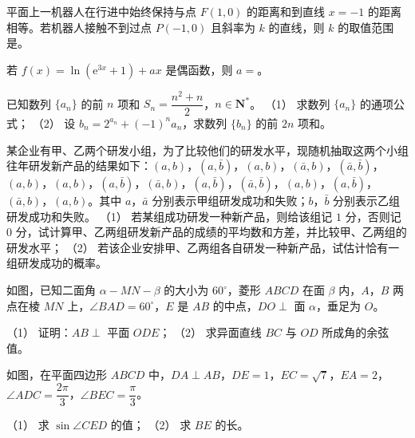 \begin{question}
平面上一机器人在行进中始终保持与点 $F(1,0)$ 的距离和到直线 $x=-1$ 的距离相等。若机器人接触不到过点 $P(-1,0)$ 且斜率为 $k$ 的直线，则 $k$ 的取值范围是\gkblank{}。
\end{question}
\begin{question}
若 $f(x)=\ln(\mathrm e^{3x}+1)+ax$ 是偶函数，则 $a=$\gkblank{}。
\end{question}
\begin{question}
已知数列 $\{a_n\}$ 的前 $n$ 项和 $S_n=\dfrac{n^2+n}2$，$n\in\mathbf N^*$。
（1） 求数列 $\{a_n\}$ 的通项公式；
（2） 设 $b_n=2^{a_n}+(-1)^na_n$，求数列 $\{b_n\}$ 的前 $2n$ 项和。
\end{question}
\begin{question}
某企业有甲、乙两个研发小组，为了比较他们的研发水平，现随机抽取这两个小组往年研发新产品的结果如下：$(a,b)$，$(a,\bar b)$，$(a,b)$，$(\bar a,b)$，$(\bar a,\bar b)$，$(a,b)$，$(a,b)$，$(a,\bar b)$，$(\bar a,b)$，$(a,\bar b)$，$(\bar a,\bar b)$，$(a,b)$，$(a,\bar b)$，$(\bar a,b)$，$(a,b)$。其中 $a$，$\bar a$ 分别表示甲组研发成功和失败；$b$，$\bar b$ 分别表示乙组研发成功和失败。
（1） 若某组成功研发一种新产品，则给该组记 $1$ 分，否则记 $0$ 分，试计算甲、乙两组研发新产品的成绩的平均数和方差，并比较甲、乙两组的研发水平；
（2） 若该企业安排甲、乙两组各自研发一种新产品，试估计恰有一组研发成功的概率。
\Needspace{0.4\textheight}
\end{question}
\begin{question}
如图，已知二面角 $\alpha-MN-\beta$ 的大小为 $60^\circ$，菱形 $ABCD$ 在面 $\beta$ 内，$A$，$B$ 两点在棱 $MN$ 上，$\angle BAD=60^\circ$，$E$ 是 $AB$ 的中点，$DO\perp$ 面 $\alpha$，垂足为 $O$。
\nopagebreak[4]
\begin{center}\end{center}
\nopagebreak[4]
（1） 证明：$AB\perp$ 平面 $ODE$；
（2） 求异面直线 $BC$ 与 $OD$ 所成角的余弦值。
\Needspace{0.4\textheight}
\end{question}
\begin{question}
如图，在平面四边形 $ABCD$ 中，$DA\perp AB$，$DE=1$，$EC=\sqrt7$，$EA=2$，$\angle ADC=\dfrac{2\pi}3$，$\angle BEC=\dfrac\pi3$。
\nopagebreak[4]
\begin{center}\end{center}
\nopagebreak[4]
（1） 求 $\sin\angle CED$ 的值；
（2） 求 $BE$ 的长。
\Needspace{0.4\textheight}
\end{question}
